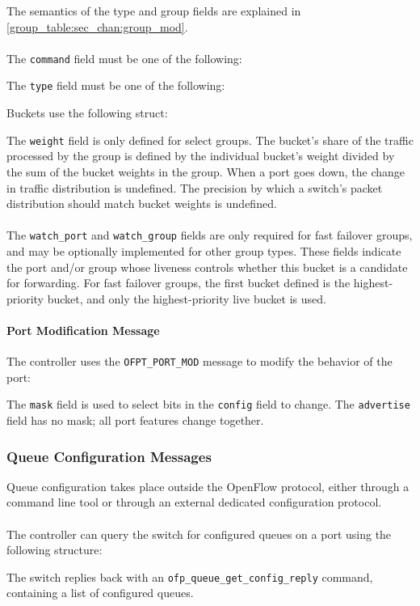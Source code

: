 
The semantics of the type and group fields are explained in \ref{group_table:sec_chan:group_mod}.
\\\\
The \verb|command| field must be one of the following:


The \verb|type| field must be one of the following:


Buckets use the following struct:


The \verb|weight| field is only defined for select groups.  The bucket's share of the traffic processed by the group is defined by the individual bucket's weight divided by the sum of the bucket weights in the group.  When a port goes down, the change in traffic distribution is undefined.  The precision by which a switch's packet distribution should match bucket weights is undefined.
\\\\
The \verb|watch_port| and \verb|watch_group| fields are only required for fast failover groups, and may be optionally implemented for other group types.  These fields indicate the port and/or group whose liveness controls whether this bucket is a candidate for forwarding.  For fast failover groups, the first bucket defined is the highest-priority bucket, and only the highest-priority live bucket is used.

\paragraph{Port Modification Message}
The controller uses the \verb|OFPT_PORT_MOD| message to modify the behavior of the port:


The \verb|mask| field is used to select bits in the \verb|config| field to change.  The \verb|advertise| field has no mask; all port features change together.

\subsubsection{Queue Configuration Messages}
Queue configuration takes place outside the OpenFlow protocol, either
  through a command line tool or through an external dedicated configuration
protocol.
\\\\
The controller can query the switch for configured queues on a port
using the following structure:

The switch replies back with an \verb|ofp_queue_get_config_reply| command, containing
a list of configured queues.

